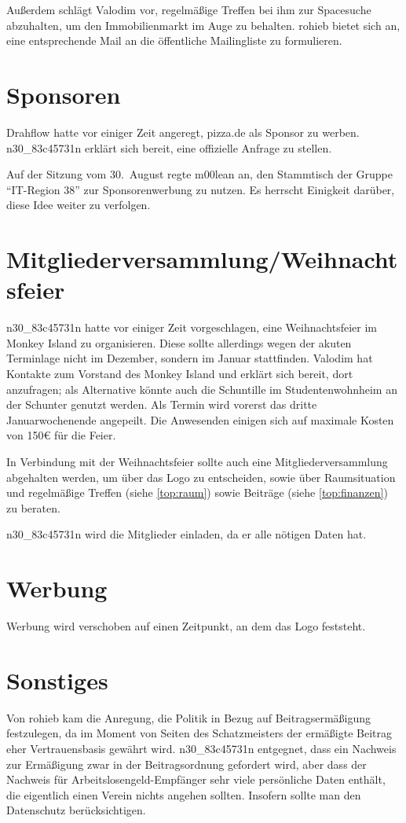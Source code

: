 \documentclass[a4paper,12pt]{scrartcl}
\begin{document}
Außerdem schlägt Valodim vor, regelmäßige Treffen bei ihm zur Spacesuche 
abzuhalten, um den Immobilienmarkt im Auge zu behalten. rohieb bietet sich an,
eine entsprechende Mail an die öffentliche Mailingliste zu formulieren.

\section{Sponsoren}
\label{top:sponsoren}
Drahflow hatte vor einiger Zeit angeregt, pizza.de als Sponsor zu werben.
n30\_83c45731n erklärt sich bereit, eine offizielle Anfrage zu stellen.

Auf der Sitzung vom 30.~August regte m00lean an, den Stammtisch der Gruppe 
"`IT-Region 38"' zur Sponsorenwerbung zu nutzen. Es herrscht Einigkeit darüber,
diese Idee weiter zu verfolgen.

\section{Mitgliederversammlung/Weihnachtsfeier}
n30\_83c45731n hatte vor einiger Zeit vorgeschlagen, eine Weihnachtsfeier im
Monkey Island zu organisieren. Diese sollte allerdings wegen der akuten 
Terminlage nicht im Dezember, sondern im Januar stattfinden. Valodim hat 
Kontakte zum Vorstand des Monkey Island und erklärt sich bereit, dort 
anzufragen; als Alternative könnte auch die Schuntille im Studentenwohnheim an 
der Schunter genutzt werden. Als Termin wird vorerst das dritte 
Januarwochenende angepeilt. Die Anwesenden einigen sich auf maximale Kosten 
von 150€ für die Feier.

In Verbindung mit der Weihnachtsfeier sollte auch eine Mitgliederversammlung
abgehalten werden, um über das Logo zu entscheiden, sowie über Raumsituation und
regelmäßige Treffen (siehe \ref{top:raum}) sowie Beiträge (siehe 
\ref{top:finanzen}) zu beraten.

n30\_83c45731n wird die Mitglieder einladen, da er alle nötigen Daten hat.

\section{Werbung}
Werbung wird verschoben auf einen Zeitpunkt, an dem das Logo feststeht.

\section{Sonstiges}
\label{top:nachweis-vs-vertrauen}
Von rohieb kam die Anregung, die Politik in Bezug auf Beitragsermäßigung 
festzulegen, da im Moment von Seiten des Schatzmeisters der ermäßigte Beitrag 
eher Vertrauensbasis gewährt wird. n30\_83c45731n entgegnet, dass ein Nachweis
zur Ermäßigung zwar in der Beitragsordnung gefordert wird, aber dass der
Nachweis für Arbeitslosengeld-Empfänger sehr viele persönliche Daten enthält, 
die eigentlich einen Verein nichts angehen sollten. Insofern sollte man den 
Datenschutz berücksichtigen.
\end{document}
